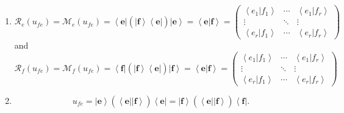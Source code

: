 \documentclass[aps,preprint]{revtex4}
\begin{document}
\begin{enumerate}
\item 
\begin{equation}
\mathcal{R}_{e}\left( u_{fe}\right) =\mathcal{M}_{e}\left( u_{fe}\right)
=\left\langle \boldsymbol{e}\right\vert \left( \overset{}{\left\vert 
\boldsymbol{f}\right\rangle \left\langle \boldsymbol{e}\right\vert }\right)
\left\vert \boldsymbol{e}\right\rangle =\left\langle \left. \boldsymbol{e}%
\right\vert \boldsymbol{f}\right\rangle =\left( 
\begin{array}{ccc}
\left\langle \left. e_{1}\right\vert f_{1}\right\rangle & \cdots & 
\left\langle \left. e_{1}\right\vert f_{r}\right\rangle \\ 
\vdots & \ddots & \vdots \\ 
\left\langle \left. e_{r}\right\vert f_{1}\right\rangle & \cdots & 
\left\langle \left. e_{r}\right\vert f_{r}\right\rangle%
\end{array}%
\right)
\end{equation}%
and%
\begin{equation}
\mathcal{R}_{f}\left( u_{fe}\right) =\mathcal{M}_{f}\left( u_{fe}\right)
=\left\langle \boldsymbol{f}\right\vert \left( \overset{}{\left\vert 
\boldsymbol{f}\right\rangle \left\langle \boldsymbol{e}\right\vert }\right)
\left\vert \boldsymbol{f}\right\rangle =\left\langle \left. \boldsymbol{e}%
\right\vert \boldsymbol{f}\right\rangle =\left( 
\begin{array}{ccc}
\left\langle \left. e_{1}\right\vert f_{1}\right\rangle & \cdots & 
\left\langle \left. e_{1}\right\vert f_{r}\right\rangle \\ 
\vdots & \ddots & \vdots \\ 
\left\langle \left. e_{r}\right\vert f_{1}\right\rangle & \cdots & 
\left\langle \left. e_{r}\right\vert f_{r}\right\rangle%
\end{array}%
\right)
\end{equation}

\item 
\begin{equation}
u_{fe}=\left\vert \boldsymbol{e}\right\rangle \left( \overset{}{\left\langle 
\boldsymbol{e}\right\vert \left\vert \boldsymbol{f}\right\rangle }\right)
\left\langle \boldsymbol{e}\right\vert =\left\vert \boldsymbol{f}%
\right\rangle \left( \overset{}{\left\langle \boldsymbol{e}\right\vert
\left\vert \boldsymbol{f}\right\rangle }\right) \left\langle \boldsymbol{f}%
\right\vert .
\end{equation}
\end{enumerate}
\end{document}
